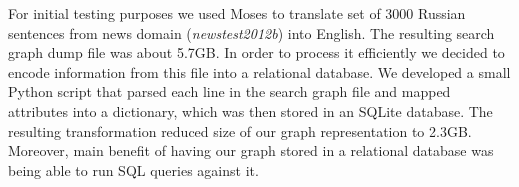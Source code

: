 For initial testing purposes we used Moses to translate set of 3000 Russian sentences from news domain (\textit{newstest2012b}) into English. The resulting search graph dump file was about 5.7GB. In order to process it efficiently we decided to encode information from this file into a relational database. We developed a small Python script that parsed each line in the search graph file and mapped attributes into a dictionary, which was then stored in an SQLite database. The resulting transformation reduced size of our graph representation to 2.3GB. Moreover, main benefit of having our graph stored in a relational database was being able to run SQL queries against it. 



